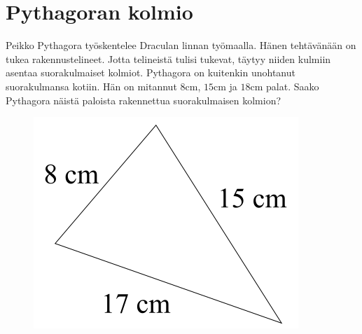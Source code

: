\clearpage

\section{Pythagoran kolmio}

Peikko Pythagora työskentelee Draculan linnan työmaalla. Hänen tehtävänään on tukea rakennustelineet. Jotta telineistä tulisi tukevat, täytyy niiden kulmiin asentaa suorakulmaiset kolmiot. Pythagora on kuitenkin unohtanut suorakulmansa kotiin. Hän on mitannut $8 \text{cm}$, $15 \text{cm}$ ja $18 \text{cm}$ palat. Saako Pythagora näistä paloista rakennettua suorakulmaisen kolmion?

\begin{figure}[h]
    \begin{center}
    \includegraphics[width=0.5\linewidth]{kuvat/pythagoran_kolmio}
    \end{center}
\end{figure}